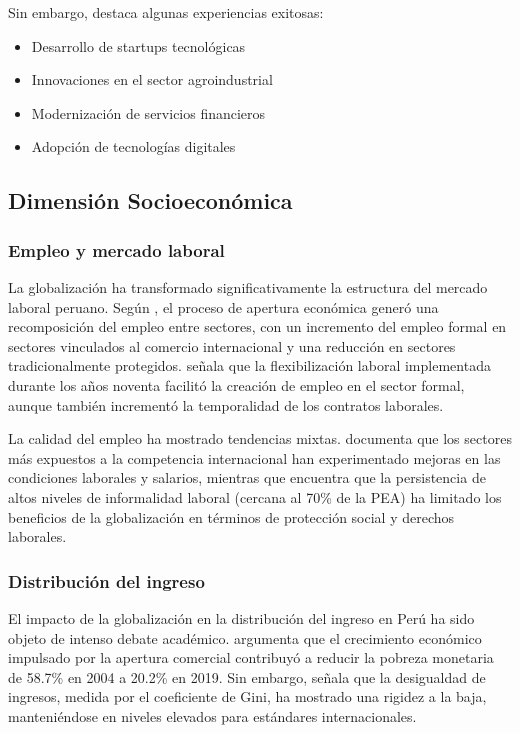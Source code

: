 \documentclass[12pt, a4paper]{article}
\begin{document}
Sin embargo, \textcite{loayza2019} destaca algunas experiencias exitosas:
\begin{itemize}
    \item Desarrollo de startups tecnológicas
    \item Innovaciones en el sector agroindustrial
    \item Modernización de servicios financieros
    \item Adopción de tecnologías digitales
\end{itemize}

\subsection{Dimensión Socioeconómica}

\subsubsection{Empleo y mercado laboral}
La globalización ha transformado significativamente la estructura del mercado laboral peruano. Según \textcite{chacaltana2016formalizacion}, el proceso de apertura económica generó una recomposición del empleo entre sectores, con un incremento del empleo formal en sectores vinculados al comercio internacional y una reducción en sectores tradicionalmente protegidos. \textcite{yamada2021labor} señala que la flexibilización laboral implementada durante los años noventa facilitó la creación de empleo en el sector formal, aunque también incrementó la temporalidad de los contratos laborales.

La calidad del empleo ha mostrado tendencias mixtas. \textcite{lavado2018efectos} documenta que los sectores más expuestos a la competencia internacional han experimentado mejoras en las condiciones laborales y salarios, mientras que \textcite{rodriguez2019informalidad} encuentra que la persistencia de altos niveles de informalidad laboral (cercana al 70\% de la PEA) ha limitado los beneficios de la globalización en términos de protección social y derechos laborales.

\subsubsection{Distribución del ingreso}
El impacto de la globalización en la distribución del ingreso en Perú ha sido objeto de intenso debate académico. \textcite{webb2019peru} argumenta que el crecimiento económico impulsado por la apertura comercial contribuyó a reducir la pobreza monetaria de 58.7\% en 2004 a 20.2\% en 2019. Sin embargo, \textcite{mendoza2020desigualdad} señala que la desigualdad de ingresos, medida por el coeficiente de Gini, ha mostrado una rigidez a la baja, manteniéndose en niveles elevados para estándares internacionales.
\end{document}
